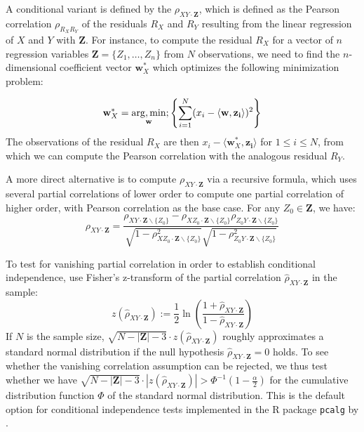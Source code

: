A conditional variant is defined by the \textit{} $\rho_{XY\cdot \mathbf{Z}}$, which is defined as the Pearson correlation $\rho_{R_XR_Y}$ of the residuals $R_X$ and $R_Y$ resulting from the linear regression of $X$ and $Y$ with $\mathbf{Z}$. For instance, to compute the residual $R_X$ for a vector of $n$ regression variables $\mathbf{Z} = \{Z_1,\dots,Z_n\}$ from $N$ observations, we need to find the $n$-dimensional coefficient vector $\mathbf{w}^{*}_X$ which optimizes the following minimization problem:
\newpage 

\begin{equation}
 \mathbf{w}^{*}_X = \underset{\mathbf{w}}{\operatorname{arg},\operatorname{min}}; \left\{\sum_{i=1}^N (x_i - \langle \mathbf{w}, \mathbf{z_i} \rangle)^2 \right\}
\end{equation}
The observations of the residual $R_X$ are then $x_i - \langle \mathbf{w}^{*}_X, \mathbf{z_i} \rangle$ for $1 \leq i \leq N$,
from which we can compute the Pearson correlation with the analogous residual $R_Y$.

A more direct alternative is to compute $\rho_{XY\cdot \mathbf{Z}}$ via a recursive formula, which uses several partial correlations of lower order to compute one partial correlation of higher order, with Pearson correlation as the base case. For any $Z_0 \in \mathbf{Z}$, we have:
\begin{equation}
 \rho_{XY\cdot \mathbf{Z}} = 
 \frac{\rho_{XY\cdot \mathbf{Z}\backslash\{Z_0\}} - \rho_{XZ_0\cdot \mathbf{Z}\backslash\{Z_0\}} \rho_{Z_0Y\cdot \mathbf{Z}\backslash\{Z_0\}}}
      {\sqrt{1-\rho^2_{XZ_0\cdot \mathbf{Z}\backslash\{Z_0\}}} \sqrt{1-\rho^2_{Z_0Y\cdot \mathbf{Z}\backslash\{Z_0\}}}}
\end{equation}

To test for vanishing partial correlation in order to establish conditional independence,
\citet[5.5]{spirtes_ea_2000} use Fisher's z-transform of the partial correlation $\hat{\rho}_{XY\cdot \mathbf{Z}}$ in the sample:
\begin{equation}
 z(\hat{\rho}_{XY\cdot \mathbf{Z}}) := \frac{1}{2} \ln\left(\frac{1 + \hat{\rho}_{XY\cdot \mathbf{Z}}}{1 - \hat{\rho}_{XY\cdot \mathbf{Z}}} \right)
\end{equation}
If $N$ is the sample size, $\sqrt{N - |\mathbf{Z}| - 3} \cdot z(\hat{\rho}_{XY\cdot \mathbf{Z}})$ roughly approximates a standard normal distribution if the null hypothesis $\hat{\rho}_{XY\cdot \mathbf{Z}} = 0$ holds. To see whether the vanishing correlation assumption can be rejected, we thus test whether we have $\sqrt{N - |\mathbf{Z}| - 3} \cdot |z(\hat{\rho}_{XY\cdot \mathbf{Z}})| > \Phi^{-1}(1 - \frac{\alpha}{2})$ for the cumulative distribution function $\Phi$ of the standard normal distribution. This is the default option for conditional independence tests implemented in the R package \texttt{pcalg} by \cite{kalisch_ea_2012}.

